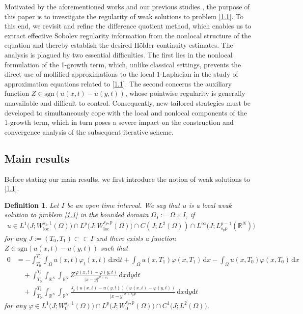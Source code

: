 \documentclass[reqno,10pt]{amsart}
\numberwithin{equation}{section}
\newtheorem{definition}[theorem]{Definition}
\begin{document}
Motivated by the aforementioned works and our previous studies \cite{LZ25, LZ2501}, the purpose of this paper is to investigate the regularity of weak solutions to problem \eqref{1.1}. To this end, we revisit and refine the difference quotient method, which enables us to extract effective Sobolev regularity information from the nonlocal structure of the equation and thereby establish the desired Hölder continuity estimates. The analysis is plagued by two essential difficulties. The first lies in the nonlocal formulation of the 1-growth term, which, unlike classical settings, prevents the direct use of mollified approximations to the local 1-Laplacian in the study of approximation equations related to \eqref{1.1}. The second concerns the auxiliary function $Z\in\mathrm{sgn}(u(x,t)-u(y,t))$, whose pointwise regularity is generally unavailable and difficult to control. Consequently, new tailored strategies must be developed to simultaneously cope with the local and nonlocal components of the $1$-growth term, which in turn poses a severe impact on the construction and convergence analysis of the subsequent iterative scheme.

\subsection{Main results}
Before stating our main results, we first introduce the notion of weak solutions to \eqref{1.1}.

\begin{definition}
	\label{def1}
	Let $I$ be an open time interval. We say that $u$ is a local weak solution to problem \eqref{1.1} in the bounded domain $\Omega_I:=\Omega\times I$, if
	\begin{align*}
		u\in L^1\bigl(J; W^{s_1, 1}_\mathrm{loc}(\Omega)\bigl)\cap L^p\bigl(J; W^{s_p, p}_\mathrm{loc}(\Omega)\bigl)\cap C\left(J; L^2(\Omega)\right)\cap L^{\infty}\bigl(J;L^{p-1}_{s_pp}(\mathbb{R}^N)\bigl)
	\end{align*}
	for any $J:=(T_0, T_1)\subset\subset I$ and there exists a function $Z\in \mathrm{sgn}\left( u(x,t)-u(y,t)\right)$ such that
	\begin{align}
		\label{1.2}
		0&=-\int_{T_0}^{T_1}\int_{\Omega}u(x,t)\varphi_t(x,t)\,\mathrm{d}x\mathrm{d}t+\int_{\Omega}u(x,T_1)\varphi(x,T_1)\,\mathrm{d}x-\int_{\Omega}u(x,T_0)\varphi(x,T_0)\,\mathrm{d}x\nonumber\\
		&\quad+\int_{T_0}^{T_1}\int_{\mathbb{R}^N}\int_{\mathbb{R}^N}Z\frac{\varphi(x,t)-\varphi(y,t)}{|x-y|^{N+s_1}}\,\mathrm{d}x\mathrm{d}y\mathrm{d}t\nonumber\\
		&\quad+\int_{T_0}^{T_1}\int_{\mathbb{R}^N}\int_{\mathbb{R}^N}\frac{J_p\left( u(x,t)-u(y,t)\right)\left( \varphi(x,t)-\varphi(y,t)\right)}{|x-y|^{N+s_pp}}\,\mathrm{d}x\mathrm{d}y\mathrm{d}t
	\end{align}
	for any $\varphi\in L^1\bigl(J;W^{s_1,1}_0(\Omega)\bigl)\cap L^p\bigl( J;W^{s_p,p}_0(\Omega)\bigl)\cap C^1\bigl(J;L^2(\Omega)\bigl)$.
\end{definition}
\end{document}

